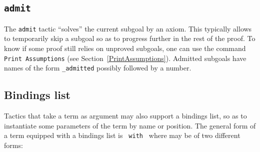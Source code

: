 
\subsection{\tt admit
\label{admit}}

The {\tt admit} tactic ``solves'' the current subgoal by an
axiom. This typically allows to temporarily skip a subgoal so as to
progress further in the rest of the proof. To know if some proof still
relies on unproved subgoals, one can use the command {\tt Print
Assumptions} (see Section~\ref{PrintAssumptions}). Admitted subgoals
have names of the form {\ident}\texttt{\_admitted} possibly followed
by a number.

\subsection{Bindings list
\label{Binding-list}}

Tactics that take a term as argument may also support a bindings list, so
as to instantiate some parameters of the term by name or position.
The general form of a term equipped with a bindings list is {\tt
{\term} with {\bindinglist}} where {\bindinglist} may be of two
different forms:

